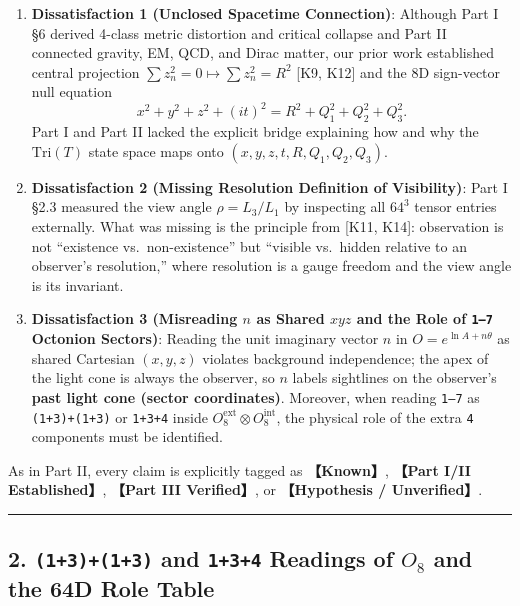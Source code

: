 \documentclass[
  a4paper,
]{article}
\providecommand{\tightlist}{%
  \setlength{\itemsep}{0pt}\setlength{\parskip}{0pt}}
\begin{document}
\begin{enumerate}
\def\labelenumi{\arabic{enumi}.}
\tightlist
\item
  \textbf{Dissatisfaction 1 (Unclosed Spacetime Connection)}: Although
  Part I §6 derived 4-class metric distortion and critical collapse and
  Part II connected gravity, EM, QCD, and Dirac matter, our prior work
  established central projection
  \(\sum z_n^2 = 0 \mapsto \sum z_n^2 = R^2\) {[}K9, K12{]} and the 8D
  sign-vector null equation
  \[x^2 + y^2 + z^2 + (it)^2 = R^2 + Q_1^2 + Q_2^2 + Q_3^2. \tag{1}\]
  Part I and Part II lacked the explicit bridge explaining how and why
  the \(\mathrm{Tri}(T)\) state space maps onto
  \((x, y, z, t, R, Q_1, Q_2, Q_3)\).
\item
  \textbf{Dissatisfaction 2 (Missing Resolution Definition of
  Visibility)}: Part I §2.3 measured the view angle \(\rho = L_3/L_1\)
  by inspecting all \(64^3\) tensor entries externally. What was missing
  is the principle from {[}K11, K14{]}: observation is not ``existence
  vs.~non-existence'' but ``visible vs.~hidden relative to an observer's
  resolution,'' where resolution is a gauge freedom and the view angle
  is its invariant.
\item
  \textbf{Dissatisfaction 3 (Misreading \(n\) as Shared \(xyz\) and the
  Role of \texttt{1–7} Octonion Sectors)}: Reading the unit imaginary
  vector \(n\) in \(O = e^{\ln A + n\theta}\) as shared Cartesian
  \((x,y,z)\) violates background independence; the apex of the light
  cone is always the observer, so \(n\) labels sightlines on the
  observer's \textbf{past light cone (sector coordinates)}. Moreover,
  when reading \texttt{1–7} as \texttt{(1+3)+(1+3)} or \texttt{1+3+4}
  inside \(O_8^{\mathrm{ext}} \otimes O_8^{\mathrm{int}}\), the physical
  role of the extra \texttt{4} components must be identified.
\end{enumerate}

As in Part II, every claim is explicitly tagged as \textbf{【Known】},
\textbf{【Part I/II Established】}, \textbf{【Part III Verified】}, or
\textbf{【Hypothesis / Unverified】}.

\begin{center}\rule{0.5\linewidth}{0.5pt}\end{center}

\subsection{\texorpdfstring{2. \texttt{(1+3)+(1+3)} and \texttt{1+3+4}
Readings of \(O_8\) and the 64D Role
Table}{2. (1+3)+(1+3) and 1+3+4 Readings of O\_8 and the 64D Role Table}}\label{and-134-readings-of-o_8-and-the-64d-role-table}
\end{document}
